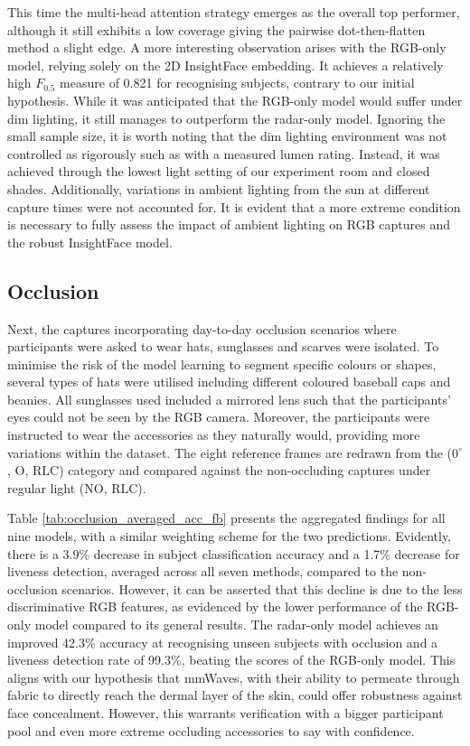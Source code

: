 \documentclass{mpaper}
\begin{document}
This time the multi-head attention strategy emerges as the overall top performer, although it still exhibits a low coverage giving the pairwise dot-then-flatten method a slight edge. A more interesting observation arises with the RGB-only model, relying solely on the 2D InsightFace embedding. It achieves a relatively high $F_{0.5}$ measure of 0.821 for recognising subjects, contrary to our initial hypothesis. While it was anticipated that the RGB-only model would suffer under dim lighting, it still manages to outperform the radar-only model. Ignoring the small sample size, it is worth noting that the dim lighting environment was not controlled as rigorously such as with a measured lumen rating. Instead, it was achieved through the lowest light setting of our experiment room and closed shades. Additionally, variations in ambient lighting from the sun at different capture times were not accounted for. It is evident that a more extreme condition is necessary to fully assess the impact of ambient lighting on RGB captures and the robust InsightFace model.


\subsection{Occlusion}
Next, the captures incorporating day-to-day occlusion scenarios where participants were asked to wear hats, sunglasses and scarves were isolated. To minimise the risk of the model learning to segment specific colours or shapes, several types of hats were utilised including different coloured baseball caps and beanies. All sunglasses used included a mirrored lens such that the participants' eyes could not be seen by the RGB camera. Moreover, the participants were instructed to wear the accessories as they naturally would, providing more variations within the dataset. The eight reference frames are redrawn from the ($0^\circ$, O, RLC) category and compared against the non-occluding captures under regular light (NO, RLC).

Table \ref{tab:occlusion_averaged_acc_fb} presents the aggregated findings for all nine models, with a similar weighting scheme for the two predictions. Evidently, there is a 3.9\% decrease in subject classification accuracy and a 1.7\% decrease for liveness detection, averaged across all seven methods, compared to the non-occlusion scenarios. However, it can be asserted that this decline is due to the less discriminative RGB features, as evidenced by the lower performance of the RGB-only model compared to its general results. The radar-only model achieves an improved 42.3\% accuracy at recognising unseen subjects with occlusion and a liveness detection rate of 99.3\%, beating the scores of the RGB-only model. This aligns with our hypothesis that mmWaves, with their ability to permeate through fabric to directly reach the dermal layer of the skin, could offer robustness against face concealment. However, this warrants verification with a bigger participant pool and even more extreme occluding accessories to say with confidence.
\end{document}
